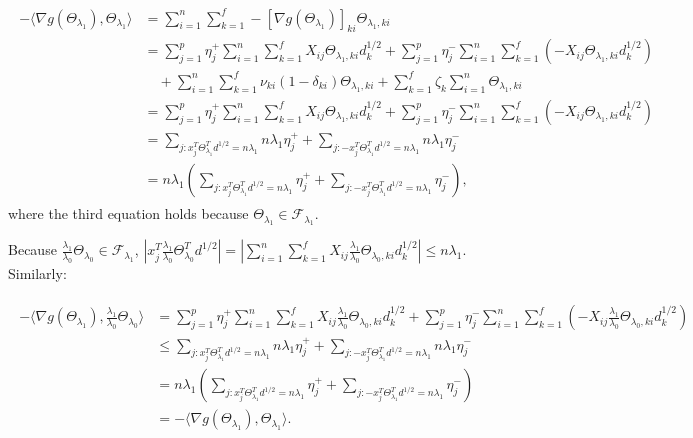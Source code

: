 \begin{gather}
    \label{eq:thm2.5}
    \begin{aligned}
        -\langle\nabla g(\Theta_{\lambda_1}),\Theta_{\lambda_1}\rangle&=\sum_{i=1}^n\sum_{k=1}^f-[\nabla g(\Theta_{\lambda_1})]_{ki}\Theta_{\lambda_1,ki}\\
        &=\sum_{j=1}^p\eta^+_j\sum_{i=1}^n\sum_{k=1}^fX_{ij}\Theta_{\lambda_1,ki}d_k^{1/2}+\sum_{j=1}^p\eta^-_j\sum_{i=1}^n\sum_{k=1}^f(-X_{ij}\Theta_{\lambda_1,ki}d_k^{1/2})\\&\quad+\sum_{i=1}^n\sum_{k=1}^f\nu_{ki}(1-\delta_{ki})\Theta_{\lambda_1,ki}+\sum_{k=1}^f\zeta_{k}\sum_{i=1}^n\Theta_{\lambda_1,ki}\\
        &=\sum_{j=1}^p\eta^+_j\sum_{i=1}^n\sum_{k=1}^fX_{ij}\Theta_{\lambda_1,ki}d_k^{1/2}+\sum_{j=1}^p\eta^-_j\sum_{i=1}^n\sum_{k=1}^f(-X_{ij}\Theta_{\lambda_1,ki}d_k^{1/2})\\
        &=\sum_{j:x_j^T\Theta_{\lambda_1}^Td^{1/2}=n\lambda_1}n\lambda_1\eta_j^++\sum_{j:-x_j^T\Theta_{\lambda_1}^Td^{1/2}=n\lambda_1}n\lambda_1\eta_j^-\\
        &=n\lambda_1\left(\sum_{j:x_j^T\Theta_{\lambda_1}^Td^{1/2}=n\lambda_1}\eta_j^++\sum_{j:-x_j^T\Theta_{\lambda_1}^Td^{1/2}=n\lambda_1}\eta_j^-\right),
    \end{aligned}
\end{gather}
where the third equation holds because $\Theta_{\lambda_1}\in\mathcal{F}_{\lambda_1}$.

Because $\frac{\lambda_1}{\lambda_0}\Theta_{\lambda_0}\in \mathcal{F}_{\lambda_1}$, $\left|x_j^T\frac{\lambda_1}{\lambda_0}\Theta_{\lambda_0}^Td^{1/2}\right|=\left|\sum_{i=1}^n\sum_{k=1}^fX_{ij}\frac{\lambda_1}{\lambda_0}\Theta_{\lambda_0,ki}d_k^{1/2}\right|\leq n\lambda_1$. Similarly:

\begin{gather}
    \label{eq:thm2.6}
    \begin{aligned}
        -\langle\nabla g(\Theta_{\lambda_1}),\frac{\lambda_1}{\lambda_0}\Theta_{\lambda_0}\rangle
        &=\sum_{j=1}^p\eta^+_j\sum_{i=1}^n\sum_{k=1}^fX_{ij}\frac{\lambda_1}{\lambda_0}\Theta_{\lambda_0,ki}d_k^{1/2}+\sum_{j=1}^p\eta^-_j\sum_{i=1}^n\sum_{k=1}^f(-X_{ij}\frac{\lambda_1}{\lambda_0}\Theta_{\lambda_0,ki}d_k^{1/2})\\
        &\leq\sum_{j:x_j^T\Theta_{\lambda_1}^Td^{1/2}=n\lambda_1}n\lambda_1\eta_j^++\sum_{j:-x_j^T\Theta_{\lambda_1}^Td^{1/2}=n\lambda_1}n\lambda_1\eta_j^-\\
        &=n\lambda_1\left(\sum_{j:x_j^T\Theta_{\lambda_1}^Td^{1/2}=n\lambda_1}\eta_j^++\sum_{j:-x_j^T\Theta_{\lambda_1}^Td^{1/2}=n\lambda_1}\eta_j^-\right)\\
        &=-\langle\nabla g(\Theta_{\lambda_1}),\Theta_{\lambda_1}\rangle.
    \end{aligned}
\end{gather}

